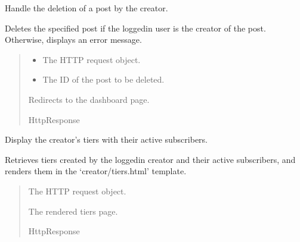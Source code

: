 \documentclass[letterpaper,10pt,english]{sphinxmanual}
\begin{document}
\begin{fulllineitems}
\label{\detokenize{modules/views:creator.views.post_delete}}
\pysigstartsignatures
{}
\pysigstopsignatures
\sphinxAtStartPar
Handle the deletion of a post by the creator.

\sphinxAtStartPar
Deletes the specified post if the logged\sphinxhyphen{}in user is the creator of the post.
Otherwise, displays an error message.
\begin{quote}\begin{description}
\begin{itemize}
\item {} 
\sphinxAtStartPar
{} \textendash{} The HTTP request object.

\item {} 
\sphinxAtStartPar
{} \textendash{} The ID of the post to be deleted.

\end{itemize}

\sphinxAtStartPar
Redirects to the dashboard page.

\sphinxAtStartPar
HttpResponse

\end{description}\end{quote}

\end{fulllineitems}


\begin{fulllineitems}
\label{\detokenize{modules/views:creator.views.tiers}}
\pysigstartsignatures
{}
\pysigstopsignatures
\sphinxAtStartPar
Display the creator’s tiers with their active subscribers.

\sphinxAtStartPar
Retrieves tiers created by the logged\sphinxhyphen{}in creator and their active subscribers,
and renders them in the ‘creator/tiers.html’ template.
\begin{quote}\begin{description}
\sphinxAtStartPar
{} \textendash{} The HTTP request object.

\sphinxAtStartPar
The rendered tiers page.

\sphinxAtStartPar
HttpResponse

\end{description}\end{quote}

\end{fulllineitems}
\end{document}
